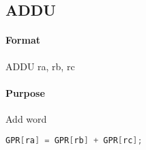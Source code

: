 \subsection{ADDU}


\paragraph{Format} ADDU ra, rb, rc

\paragraph{Purpose} Add word

\begin{lstlisting}[language=c]
    GPR[ra] = GPR[rb] + GPR[rc];
\end{lstlisting}
